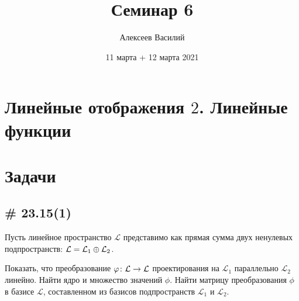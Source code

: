 \documentclass[a4paper,12pt]{article}
\author{Алексеев Василий}
\title{Семинар 6}
\date{11 марта + 12 марта 2021}
\begin{document}
  \maketitle
  
  \tableofcontents

  \thispagestyle{empty}
  
  \newpage
  


  \section{Линейные отображения $2$. Линейные функции}
  
  \section{Задачи}
  
  
  \subsection{\# 23.15(1)}
  
  Пусть линейное пространство $\mathcal L$ представимо как прямая сумма двух ненулевых подпространств: $\mathcal L \hm= \mathcal L_1 \oplus \mathcal L_2$.
  
  Показать, что преобразование $\phi\colon \mathcal L \hm\to \mathcal L$ проектирования на $\mathcal L_1$ параллельно $\mathcal L_2$ линейно.
  Найти ядро и множество значений $\phi$.
  Найти матрицу преобразования $\phi$ в базисе $\mathcal L$, составленном из базисов подпространств $\mathcal L_1$ и $\mathcal L_2$.
  
\end{document}
